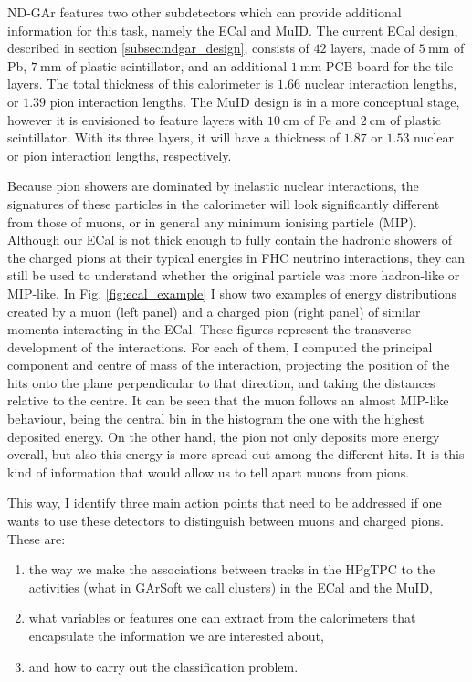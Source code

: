 ND-GAr features two other subdetectors which can provide additional information for this task, namely the ECal and MuID. The current ECal design, described in section \ref{subsec:ndgar_design}, consists of $42$ layers, made of $5~\mathrm{mm}$ of Pb, $7~\mathrm{mm}$ of plastic scintillator, and an additional $1~\mathrm{mm}$ PCB board for the tile layers. The total thickness of this calorimeter is $1.66$ nuclear interaction lengths, or $1.39$ pion interaction lengths. The MuID design is in a more conceptual stage, however it is envisioned to feature layers with $10~\mathrm{cm}$ of Fe and $2~\mathrm{cm}$ of plastic scintillator. With its three layers, it will have a thickness of $1.87$ or $1.53$ nuclear or pion interaction lengths, respectively.

Because pion showers are dominated by inelastic nuclear interactions, the signatures of these particles in the calorimeter will look significantly different from those of muons, or in general any minimum ionising particle (MIP). Although our ECal is not thick enough to fully contain the hadronic showers of the charged pions at their typical energies in FHC neutrino interactions, they can still be used to understand whether the original particle was more hadron-like or MIP-like. In Fig. \ref{fig:ecal_example} I show two examples of energy distributions created by a muon (left panel) and a charged pion (right panel) of similar momenta interacting in the ECal. These figures represent the transverse development of the interactions. For each of them, I computed the principal component and centre of mass of the interaction, projecting the position of the hits onto the plane perpendicular to that direction, and taking the distances relative to the centre. It can be seen that the muon follows an almost MIP-like behaviour, being the central bin in the histogram the one with the highest deposited energy. On the other hand, the pion not only deposits more energy overall, but also this energy is more spread-out among the different hits. It is this kind of information that would allow us to tell apart muons from pions.

This way, I identify three main action points that need to be addressed if one wants to use these detectors to distinguish between muons and charged pions. These are:
\begin{enumerate}
	\item the way we make the associations between tracks in the HPgTPC to the activities (what in GArSoft we call clusters) in the ECal and the MuID,
	\item what variables or features one can extract from the calorimeters that encapsulate the information we are interested about,
	\item and how to carry out the classification problem.
\end{enumerate}

